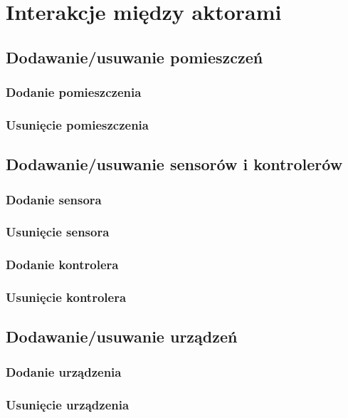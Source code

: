 \chapter{Interakcje między aktorami}

\section{Dodawanie/usuwanie pomieszczeń}
\subsection*{Dodanie pomieszczenia}
% 
\subsection*{Usunięcie pomieszczenia}

\section{Dodawanie/usuwanie sensorów i kontrolerów}
\subsection*{Dodanie sensora}

\subsection*{Usunięcie sensora}
\subsection*{Dodanie kontrolera}
\subsection*{Usunięcie kontrolera}

\section{Dodawanie/usuwanie urządzeń}
\subsection*{Dodanie urządzenia}
\subsection*{Usunięcie urządzenia}

